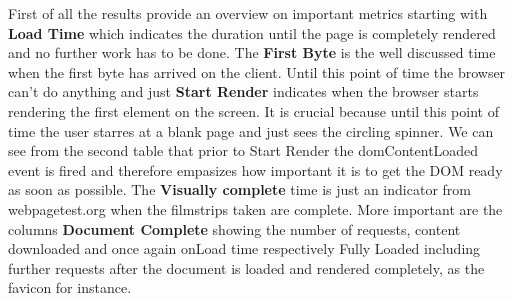 First of all the results provide an overview on important metrics starting with \textbf{Load Time} which indicates the duration until the page is completely rendered and no further work has to be done. The \textbf{First Byte} is the well discussed time when the first byte has arrived on the client. Until this point of time the browser can't do anything and just \textbf{Start Render} indicates when the browser starts rendering the first element on the screen. It is crucial because until this point of time the user starres at a blank page and just sees the circling spinner. We can see from the second table that prior to Start Render the domContentLoaded event is fired and therefore empasizes how important it is to get the DOM ready as soon as possible. The \textbf{Visually complete} time is just an indicator from webpagetest.org when the filmstrips taken are complete. More important are the columns \textbf{Document Complete} showing the number of requests, content downloaded and once again onLoad time respectively Fully Loaded including further requests after the document is loaded and rendered completely, as the favicon for instance. 

